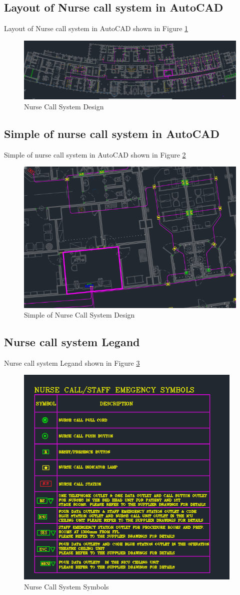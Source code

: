 \documentclass[12pt,fleqn]{book} %
\begin{document}
\subsection{Layout of Nurse call system in AutoCAD }
Layout of Nurse call system in AutoCAD shown in Figure \ref{fig:nurse new 1}
\begin{figure}[!h]
    \centering
    \includegraphics[width=1\linewidth]{nurse new 1.png}
    \caption{Nurse Call System Design}
    \label{fig:nurse new 1}
    \end{figure}
\subsection{Simple of nurse call system in AutoCAD}
Simple of nurse call system in AutoCAD shown in Figure \ref{fig:nurse new 2}
\begin{figure}[!h]
    \centering
    \includegraphics[width=0.6\linewidth]{nurse new 2.png}
    \caption{Simple of Nurse Call System Design}
    \label{fig:nurse new 2}
    \end{figure}
\subsection{Nurse call system Legand }
Nurse call system Legand shown in Figure \ref{fig:nurse new 3}
\begin{figure}[!h]
    \centering
    \includegraphics[width=0.6\linewidth]{nurse new 3.png}
    \caption{Nurse Call System Symbols}
    \label{fig:nurse new 3}
    \end{figure}
\newpage
\end{document}
